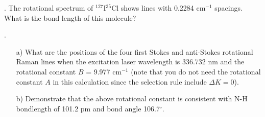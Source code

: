 
. The rotational spectrum of $^{127}$I$^{35}$Cl shows lines with 0.2284 cm$^{-1}$ spacings. What is the bond length of this molecule?\\


.

\begin{itemize}
\item[a)] What are the positions of the four first Stokes and anti-Stokes rotational Raman lines when the excitation laser wavelength is 336.732 nm and the rotational constant $B$ = 9.977 cm$^{-1}$ (note that you do not need the rotational constant $A$ in this calculation since the selection rule include $\Delta K = 0$).

\item[b)] Demonstrate that the above rotational constant is consistent with N-H bondlength of 101.2 pm and bond angle 106.7$^\circ$. 

\end{itemize}




